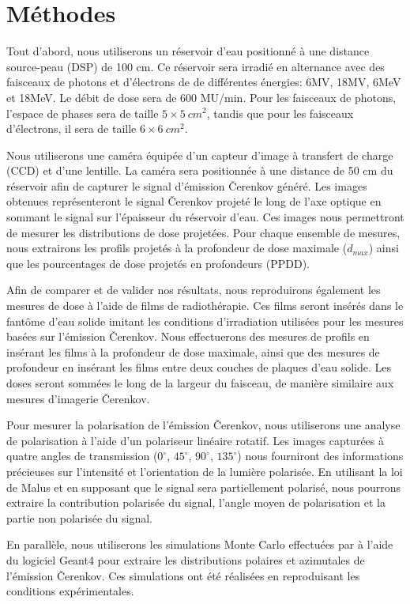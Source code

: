 \documentclass{Thesis}
\begin{document}
\section*{Méthodes}
Tout d'abord, nous utiliserons un réservoir d'eau positionné à une distance source-peau (DSP) de 100 cm.
Ce réservoir sera irradié en alternance avec des faisceaux de photons et d'électrons de de différentes énergies: 6MV, 18MV, 6MeV et 18MeV.
Le débit de dose sera de 600 MU/min.
Pour les faisceaux de photons, l'espace de phases sera de taille $5 \times \SI{5}{cm^2}$, tandis que pour les faisceaux d'électrons, il sera de taille $6 \times \SI{6}{cm^2}$.

Nous utiliserons une caméra équipée d'un capteur d'image à transfert de charge (CCD) et d'une lentille.
La caméra sera positionnée à une distance de 50 cm du réservoir afin de capturer le signal d'émission Čerenkov généré.
Les images obtenues représenteront le signal Čerenkov projeté le long de l'axe optique en sommant le signal sur l'épaisseur du réservoir d'eau.
Ces images nous permettront de mesurer les distributions de dose projetées.
Pour chaque ensemble de mesures, nous extrairons les profils projetés à la profondeur de dose maximale ($d_{max}$) ainsi que les pourcentages de dose projetés en profondeurs (PPDD).

Afin de comparer et de valider nos résultats, nous reproduirons également les mesures de dose à l'aide de films de radiothérapie.
Ces films seront insérés dans le fantôme d'eau solide imitant les conditions d'irradiation utilisées pour les mesures basées sur l'émission Čerenkov.
Nous effectuerons des mesures de profils en insérant les films à la profondeur de dose maximale, ainsi que des mesures de profondeur en insérant les films entre deux couches de plaques d'eau solide.
Les doses seront sommées le long de la largeur du faisceau, de manière similaire aux mesures d'imagerie Čerenkov.

Pour mesurer la polarisation de l'émission Čerenkov, nous utiliserons une analyse de polarisation à l'aide d'un polariseur linéaire rotatif.
Les images capturées à quatre angles de transmission ($0^\circ$, $45^\circ$, $90^\circ$, $135^\circ$) nous fourniront des informations précieuses sur l'intensité et l'orientation de la lumière polarisée.
En utilisant la loi de Malus et en supposant que le signal sera partiellement polarisé, nous pourrons extraire la contribution polarisée du signal, l'angle moyen de polarisation et la partie non polarisée du signal.

En parallèle, nous utiliserons les simulations Monte Carlo effectuées par  à l'aide du logiciel Geant4 pour extraire les distributions polaires et azimutales de l'émission Čerenkov.
Ces simulations ont été réalisées en reproduisant les conditions expérimentales.
\end{document}
